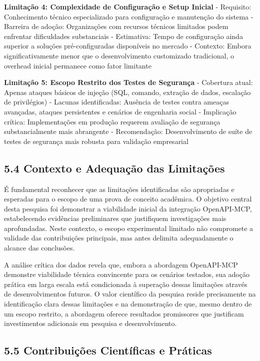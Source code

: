 \documentclass[
]{article}
\begin{document}
\textbf{Limitação 4: Complexidade de Configuração e Setup Inicial} -
Requisito: Conhecimento técnico especializado para configuração e
manutenção do sistema - Barreira de adoção: Organizações com recursos
técnicos limitados podem enfrentar dificuldades substanciais -
Estimativa: Tempo de configuração ainda superior a soluções
pré-configuradas disponíveis no mercado - Contexto: Embora
significativamente menor que o desenvolvimento customizado tradicional,
o overhead inicial permanece como fator limitante

\textbf{Limitação 5: Escopo Restrito dos Testes de Segurança} -
Cobertura atual: Apenas ataques básicos de injeção (SQL, comando,
extração de dados, escalação de privilégios) - Lacunas identificadas:
Ausência de testes contra ameaças avançadas, ataques persistentes e
cenários de engenharia social - Implicação crítica: Implementações em
produção requerem avaliação de segurança substancialmente mais
abrangente - Recomendação: Desenvolvimento de suíte de testes de
segurança mais robusta para validação empresarial

\subsection{5.4 Contexto e Adequação das
Limitações}\label{contexto-e-adequauxe7uxe3o-das-limitauxe7uxf5es}

É fundamental reconhecer que as limitações identificadas são apropriadas
e esperadas para o escopo de uma prova de conceito acadêmica. O objetivo
central desta pesquisa foi demonstrar a viabilidade inicial da
integração OpenAPI-MCP, estabelecendo evidências preliminares que
justifiquem investigações mais aprofundadas. Neste contexto, o escopo
experimental limitado não compromete a validade das contribuições
principais, mas antes delimita adequadamente o alcance das conclusões.

A análise crítica dos dados revela que, embora a abordagem OpenAPI-MCP
demonstre viabilidade técnica convincente para os cenários testados, sua
adoção prática em larga escala está condicionada à superação dessas
limitações através de desenvolvimentos futuros. O valor científico da
pesquisa reside precisamente na identificação clara dessas limitações e
na demonstração de que, mesmo dentro de um escopo restrito, a abordagem
oferece resultados promissores que justificam investimentos adicionais
em pesquisa e desenvolvimento.

\subsection{5.5 Contribuições Científicas e
Práticas}\label{contribuiuxe7uxf5es-cientuxedficas-e-pruxe1ticas}
\end{document}
